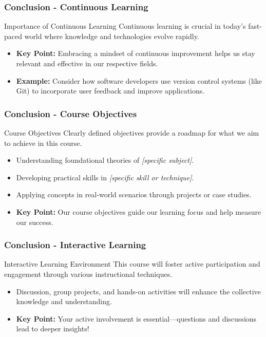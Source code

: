 \documentclass[aspectratio=169]{beamer}
\begin{document}
\begin{frame}[fragile]
  \frametitle{Conclusion - Continuous Learning}
  \begin{block}{Importance of Continuous Learning}
    Continuous learning is crucial in today’s fast-paced world where knowledge and technologies evolve rapidly. 
  \end{block}
  \begin{itemize}
    \item \textbf{Key Point:} Embracing a mindset of continuous improvement helps us stay relevant and effective in our respective fields.
    \item \textbf{Example:} Consider how software developers use version control systems (like Git) to incorporate user feedback and improve applications.
  \end{itemize}
\end{frame}

\begin{frame}[fragile]
  \frametitle{Conclusion - Course Objectives}
  \begin{block}{Course Objectives}
    Clearly defined objectives provide a roadmap for what we aim to achieve in this course.
  \end{block}
  \begin{itemize}
    \item Understanding foundational theories of \textit{[specific subject]}.
    \item Developing practical skills in \textit{[specific skill or technique]}.
    \item Applying concepts in real-world scenarios through projects or case studies.
  \end{itemize}
  \begin{itemize}
    \item \textbf{Key Point:} Our course objectives guide our learning focus and help measure our success.
  \end{itemize}
\end{frame}

\begin{frame}[fragile]
  \frametitle{Conclusion - Interactive Learning}
  \begin{block}{Interactive Learning Environment}
    This course will foster active participation and engagement through various instructional techniques.
  \end{block}
  \begin{itemize}
    \item Discussion, group projects, and hands-on activities will enhance the collective knowledge and understanding.
    \item \textbf{Key Point:} Your active involvement is essential—questions and discussions lead to deeper insights!
  \end{itemize}
\end{frame}
\end{document}
